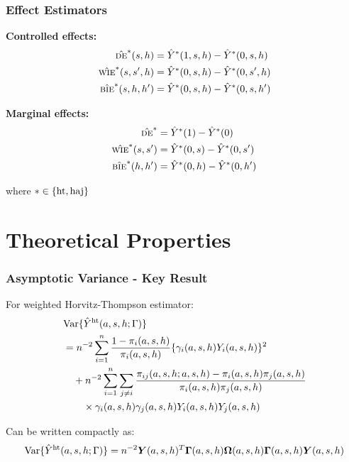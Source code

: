 \documentclass{beamer}
\newcommand{\de}{\textsc{de}}
\newcommand{\bie}{\textsc{bie}}
\newcommand{\wie}{\textsc{wie}}
\newcommand{\horthom}{\textup{ht}}
\newcommand{\haj}{\textup{haj}}
\newcommand{\pscore}[1]{\pi_{#1}}
\newcommand{\sumi}{\sum_{i=1}^n}
\newcommand{\bY}{\boldsymbol{Y}}
\newcommand{\bOmega}{\boldsymbol{\Omega}}
\newcommand{\bGamma}{\boldsymbol{\Gamma}}
\begin{document}
\begin{frame}
\frametitle{Effect Estimators}
\textbf{Controlled effects:}
\begin{align}
\hat{\de}^*(s,h) &= \hat{Y}^*(1,s,h) - \hat{Y}^*(0,s,h) \\
\hat{\wie}^*(s,s',h) &= \hat{Y}^*(0,s,h) - \hat{Y}^*(0,s',h) \\
\hat{\bie}^*(s,h,h') &= \hat{Y}^*(0,s,h) - \hat{Y}^*(0,s,h')
\end{align}

\vspace{0.5cm}
\textbf{Marginal effects:}
\begin{align}
\hat{\de}^* &= \hat{Y}^*(1) - \hat{Y}^*(0) \\
\hat{\wie}^*(s,s') &= \hat{Y}^*(0,s) - \hat{Y}^*(0,s') \\
\hat{\bie}^*(h,h') &= \hat{Y}^*(0,h) - \hat{Y}^*(0,h')
\end{align}

where $* \in \{\horthom, \haj\}$
\end{frame}

\section{Theoretical Properties}

\begin{frame}
\frametitle{Asymptotic Variance - Key Result}
For weighted Horvitz-Thompson estimator:
\begin{align}
&\text{Var}\{\hat{Y}^{\horthom}(a,s,h;\Gamma)\} \\
&= n^{-2}\sumi \frac{1-\pscore{i}(a,s,h)}{\pscore{i}(a,s,h)}\{\gamma_i(a,s,h)Y_i(a,s,h)\}^2 \\
&\quad + n^{-2}\sumi\sum_{j\neq i}\frac{\pscore{ij}(a,s,h;a,s,h) - \pscore{i}(a,s,h)\pscore{j}(a,s,h)}{\pscore{i}(a,s,h)\pscore{j}(a,s,h)} \\
&\qquad \times \gamma_i(a,s,h)\gamma_j(a,s,h)Y_i(a,s,h)Y_j(a,s,h)
\end{align}

\vspace{0.5cm}
Can be written compactly as:
$$\text{Var}\{\hat{Y}^{\horthom}(a,s,h;\Gamma)\} = n^{-2}\bY(a,s,h)^T\bGamma(a,s,h)\bOmega(a,s,h)\bGamma(a,s,h)\bY(a,s,h)$$
\end{frame}
\end{document}
